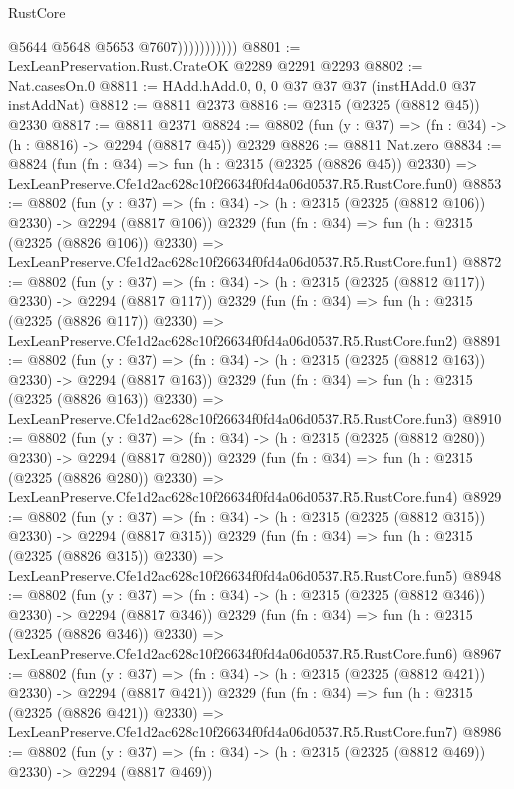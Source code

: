 \begin{lexlean}{RustCore}
\begin{coremodule}
                          @5644
                          @5648
                          @5653
                          @7607)))))))))))
@8801 := LexLeanPreservation.Rust.CrateOK @2289 @2291 @2293
@8802 := Nat.casesOn.{0}
@8811 := HAdd.hAdd.{0, 0, 0} @37 @37 @37 (instHAdd.{0} @37 instAddNat)
@8812 := @8811 @2373
@8816 := @2315 (@2325 (@8812 @45)) @2330
@8817 := @8811 @2371
@8824 := @8802 (fun (y : @37) => (fn : @34) -> (h : @8816) -> @2294 (@8817 @45)) @2329
@8826 := @8811 Nat.zero
@8834 := @8824
    (fun (fn : @34) =>
    fun (h : @2315 (@2325 (@8826 @45)) @2330) =>
    LexLeanPreserve.Cfe1d2ac628c10f26634f0fd4a06d0537.R5.RustCore.fun0)
@8853 := @8802
    (fun (y : @37) => (fn : @34) -> (h : @2315 (@2325 (@8812 @106)) @2330) -> @2294 (@8817 @106))
    @2329
    (fun (fn : @34) =>
    fun (h : @2315 (@2325 (@8826 @106)) @2330) =>
    LexLeanPreserve.Cfe1d2ac628c10f26634f0fd4a06d0537.R5.RustCore.fun1)
@8872 := @8802
    (fun (y : @37) => (fn : @34) -> (h : @2315 (@2325 (@8812 @117)) @2330) -> @2294 (@8817 @117))
    @2329
    (fun (fn : @34) =>
    fun (h : @2315 (@2325 (@8826 @117)) @2330) =>
    LexLeanPreserve.Cfe1d2ac628c10f26634f0fd4a06d0537.R5.RustCore.fun2)
@8891 := @8802
    (fun (y : @37) => (fn : @34) -> (h : @2315 (@2325 (@8812 @163)) @2330) -> @2294 (@8817 @163))
    @2329
    (fun (fn : @34) =>
    fun (h : @2315 (@2325 (@8826 @163)) @2330) =>
    LexLeanPreserve.Cfe1d2ac628c10f26634f0fd4a06d0537.R5.RustCore.fun3)
@8910 := @8802
    (fun (y : @37) => (fn : @34) -> (h : @2315 (@2325 (@8812 @280)) @2330) -> @2294 (@8817 @280))
    @2329
    (fun (fn : @34) =>
    fun (h : @2315 (@2325 (@8826 @280)) @2330) =>
    LexLeanPreserve.Cfe1d2ac628c10f26634f0fd4a06d0537.R5.RustCore.fun4)
@8929 := @8802
    (fun (y : @37) => (fn : @34) -> (h : @2315 (@2325 (@8812 @315)) @2330) -> @2294 (@8817 @315))
    @2329
    (fun (fn : @34) =>
    fun (h : @2315 (@2325 (@8826 @315)) @2330) =>
    LexLeanPreserve.Cfe1d2ac628c10f26634f0fd4a06d0537.R5.RustCore.fun5)
@8948 := @8802
    (fun (y : @37) => (fn : @34) -> (h : @2315 (@2325 (@8812 @346)) @2330) -> @2294 (@8817 @346))
    @2329
    (fun (fn : @34) =>
    fun (h : @2315 (@2325 (@8826 @346)) @2330) =>
    LexLeanPreserve.Cfe1d2ac628c10f26634f0fd4a06d0537.R5.RustCore.fun6)
@8967 := @8802
    (fun (y : @37) => (fn : @34) -> (h : @2315 (@2325 (@8812 @421)) @2330) -> @2294 (@8817 @421))
    @2329
    (fun (fn : @34) =>
    fun (h : @2315 (@2325 (@8826 @421)) @2330) =>
    LexLeanPreserve.Cfe1d2ac628c10f26634f0fd4a06d0537.R5.RustCore.fun7)
@8986 := @8802
    (fun (y : @37) => (fn : @34) -> (h : @2315 (@2325 (@8812 @469)) @2330) -> @2294 (@8817 @469))

\end{coremodule}
\end{lexlean}
